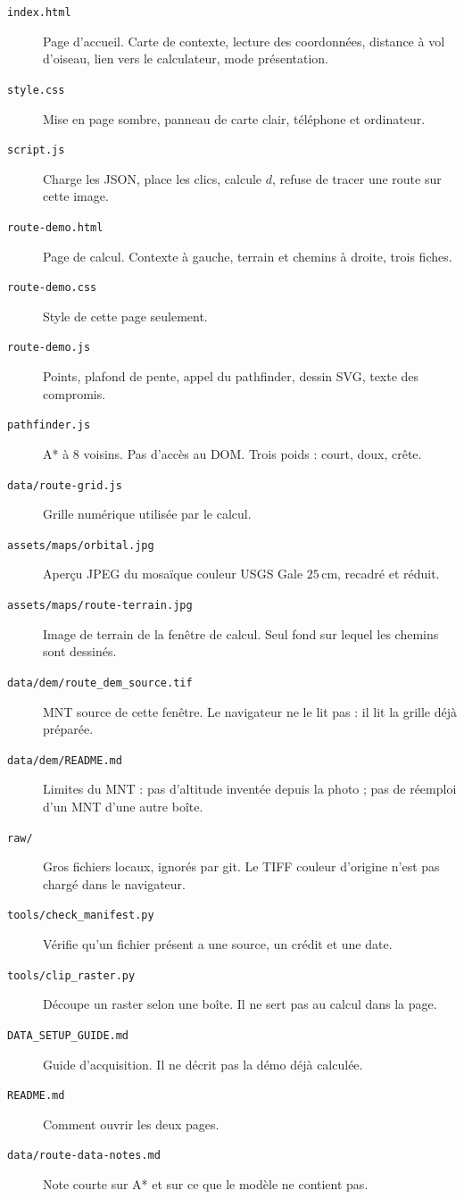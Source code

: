 \documentclass[11pt,a4paper]{article}
\begin{document}
\begin{description}
\item[\texttt{index.html}] Page d'accueil. Carte de contexte, lecture des coordonnées, distance à vol d'oiseau, lien vers le calculateur, mode présentation.
\item[\texttt{style.css}] Mise en page sombre, panneau de carte clair, téléphone et ordinateur.
\item[\texttt{script.js}] Charge les JSON, place les clics, calcule \(d\), refuse de tracer une route sur cette image.
\item[\texttt{route-demo.html}] Page de calcul. Contexte à gauche, terrain et chemins à droite, trois fiches.
\item[\texttt{route-demo.css}] Style de cette page seulement.
\item[\texttt{route-demo.js}] Points, plafond de pente, appel du pathfinder, dessin SVG, texte des compromis.
\item[\texttt{pathfinder.js}] A* à 8 voisins. Pas d'accès au DOM. Trois poids : court, doux, crête.
\item[\texttt{data/route-grid.js}] Grille numérique utilisée par le calcul.
\item[\texttt{assets/maps/orbital.jpg}] Aperçu JPEG du mosaïque couleur USGS Gale \(25\,\mathrm{cm}\), recadré et réduit.
\item[\texttt{assets/maps/route-terrain.jpg}] Image de terrain de la fenêtre de calcul. Seul fond sur lequel les chemins sont dessinés.
\item[\texttt{data/dem/route\_dem\_source.tif}] MNT source de cette fenêtre. Le navigateur ne le lit pas : il lit la grille déjà préparée.
\item[\texttt{data/dem/README.md}] Limites du MNT : pas d'altitude inventée depuis la photo ; pas de réemploi d'un MNT d'une autre boîte.
\item[\texttt{raw/}] Gros fichiers locaux, ignorés par git. Le TIFF couleur d'origine n'est pas chargé dans le navigateur.
\item[\texttt{tools/check\_manifest.py}] Vérifie qu'un fichier présent a une source, un crédit et une date.
\item[\texttt{tools/clip\_raster.py}] Découpe un raster selon une boîte. Il ne sert pas au calcul dans la page.
\item[\texttt{DATA\_SETUP\_GUIDE.md}] Guide d'acquisition. Il ne décrit pas la démo déjà calculée.
\item[\texttt{README.md}] Comment ouvrir les deux pages.
\item[\texttt{data/route-data-notes.md}] Note courte sur A* et sur ce que le modèle ne contient pas.
\end{description}
\end{document}
